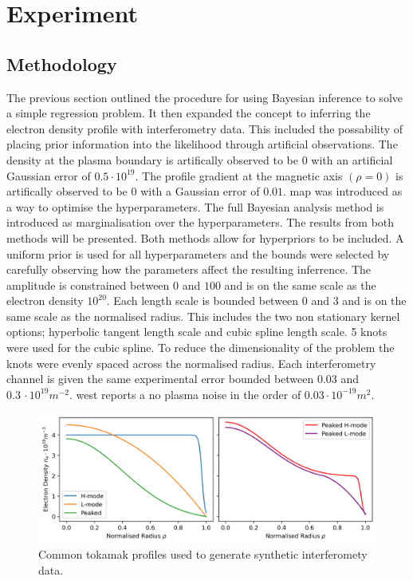 \chapter{Experiment}

\section{Methodology}
The previous section outlined the procedure for using Bayesian inference to solve a simple regression problem. It then expanded the concept to inferring the electron density profile with interferometry data. This included the possability of placing prior information into the likelihood through artificial observations. The density at the plasma boundary is artifically observed to be 0 with an artificial Gaussian error of $0.5 \cdot 10^{19}$. The profile gradient at the magnetic axis $(\rho=0)$ is artifically observed to be 0 with a Gaussian error of $0.01$. \gls{map} was introduced as a way to optimise the hyperparameters. The full Bayesian analysis method is introduced as marginalisation over the hyperparameters. The results from both methods will be presented. Both methods allow for hyperpriors to be included. A uniform prior is used for all hyperparameters and the bounds were selected by carefully observing how the parameters affect the resulting inferrence. The amplitude is constrained between $0$ and $100$ and is on the same scale as the electron density $10^{20}$. Each length scale is bounded between $0$ and $3$ and is on the same scale as the normalised radius. This includes the two non stationary kernel options; hyperbolic tangent length scale and cubic spline length scale. 5 knots were used for the cubic spline. To reduce the dimensionality of the problem the knots were evenly spaced across the normalised radius. Each interferometry channel is given the same experimental error bounded between $0.03$ and $0.3 \, \cdot 10^{19}m^{-2}$. \gls{west} reports a no plasma noise in the order of $0.03 \cdot10^{-19}m^2$. 

\begin{figure}[H]
    \centering
    \includegraphics[width=\textwidth]{images/syntheticProfiles.png}
    \caption{Common tokamak profiles used to generate synthetic interferomety data.}
    \label{fig:groundtruth}
\end{figure}

